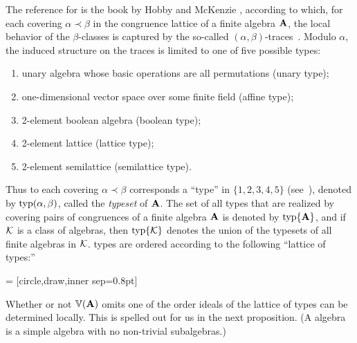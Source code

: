 The reference for \tct is the book by Hobby and McKenzie
\cite{HM:1988}, according to which,
for each covering $\alpha \prec \beta$ in the congruence lattice of a finite
algebra $\mathbf{A}$, the local behavior of the $\beta$-classes is captured by the
so-called $(\alpha, \beta)$-traces~\cite[Def.~2.15]{HM:1988}.
Modulo $\alpha$, the induced structure on the traces is limited to one
of five possible types:

\begin{enumerate}[(1)]
\item unary algebra whose basic operations are all permutations (unary type);
\item one-dimensional vector space over some finite field (affine type);
\item 2-element boolean algebra (boolean type);
\item 2-element lattice (lattice type);
\item 2-element semilattice (semilattice type).
\end{enumerate}

Thus to each covering $\alpha \prec \beta$
corresponds a ``\tct type'' in $\{1,2,3,4,5\}$ (see~\cite[Def.~5.1]{HM:1988}),
denoted by $\operatorname{typ}(\alpha, \beta)$, called the \emph{typeset} of $\mathbf{A}$.
The set of all \tct types that are realized by covering pairs of congruences of a
finite algebra $\mathbf{A}$ is denoted by $\operatorname{typ}\{\mathbf{A}\}$, and if $\mathcal{K}$ is a class of algebras,
then $\operatorname{typ}\{\mathcal{K}\}$ denotes the union of the typesets of all finite algebras in $\mathcal{K}$.
\tct types are ordered according to the following ``lattice of types:''

\newcommand{\dotsize}{0.8pt}
 = [circle,draw,inner sep=\dotsize]
\begin{center}
\newcommand{\figscale}{.7}
\end{center}
Whether or not $\operatorname{\mathbb{V}}(\mathbf{A})$ omits one of the order ideals of the lattice of types can be
determined locally.  This is spelled out for us in the next proposition.
(A  algebra is a simple
algebra with no non-trivial subalgebras.)


